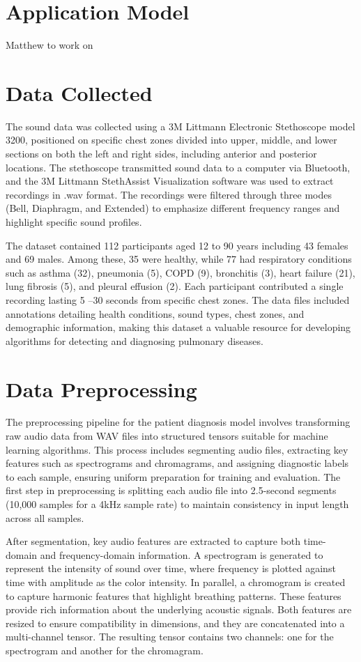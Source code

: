 \documentclass[twocolumn]{article}
\begin{document}
\section{Application Model}  
Matthew to work on

\section{Data Collected}  
The sound data was collected using a 3M Littmann Electronic Stethoscope model 3200, 
positioned on specific chest zones divided into upper, middle, and lower sections on both 
the left and right sides, including anterior and posterior locations. The stethoscope transmitted sound 
data to a computer via Bluetooth, and the 3M Littmann  StethAssist Visualization software was 
used to extract recordings in .wav format. The recordings were filtered through three modes 
(Bell, Diaphragm, and Extended) to emphasize different frequency ranges and highlight specific sound profiles.

The dataset contained 112 participants aged 12 to 90 years including 43 females and 
69 males. Among these, 35 were healthy, while 77 had respiratory conditions such as 
asthma (32), pneumonia (5), COPD (9), bronchitis (3), heart failure (21), lung 
fibrosis (5), and pleural effusion (2). Each participant contributed a single recording lasting 5
–30 seconds from specific chest zones. The data files included annotations detailing health conditions, 
sound types, chest zones, and demographic information, making this dataset a valuable resource 
for developing algorithms for detecting and diagnosing pulmonary diseases.


\section{Data Preprocessing} 
The preprocessing pipeline for the patient diagnosis model involves transforming raw audio data from WAV files into structured tensors suitable for machine learning algorithms. This process includes segmenting audio files, extracting key features such as spectrograms and chromagrams, and assigning diagnostic labels to each sample, ensuring uniform preparation for training and evaluation. The first step in preprocessing is splitting each audio file into 2.5-second segments (10,000 samples for a 4kHz sample rate) to maintain consistency in input length across all samples.

After segmentation, key audio features are extracted to capture both time-domain and frequency-domain information. A spectrogram is generated to represent the intensity of sound over time, where frequency is plotted against time with amplitude as the color intensity. In parallel, a chromogram is created to capture harmonic features that highlight breathing patterns. These features provide rich information about the underlying acoustic signals. Both features are resized to ensure compatibility in dimensions, and they are concatenated into a multi-channel tensor. The resulting tensor contains two channels: one for the spectrogram and another for the chromagram.
\end{document}
